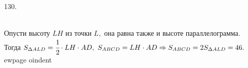 130. \begin{figure}[ht!]
\end{figure}\\
Опусти высоту $LH$ из точки $L,$ она равна также и высоте параллелограмма. Тогда $S_{\Delta ALD}=\cfrac{1}{2}\cdot LH\cdot AD,\ S_{ABCD}=LH\cdot AD\Rightarrow
S_{ABCD}=2S_{\Delta ALD}=46.$
ewpage
oindent
